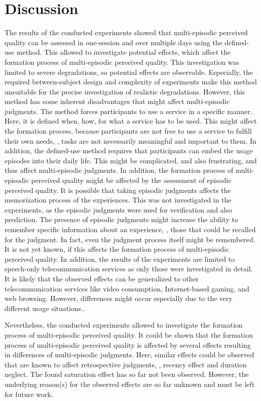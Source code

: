 \section{Discussion}
The results of the conducted experiments showed that multi-episodic perceived quality can be assessed in one-session and over multiple days using the defined-use method.
This allowed to investigate potential effects, which affect the formation process of multi-episodic perceived quality.
This investigation was limited to severe degradations, so potential effects are observable.
Especially, the required between-subject design and complexity of experiments make this method unsuitable for the precise investigation of realistic degradations.
However, this method has some inherent disadvantages that might affect multi-episodic judgments.
The method forces participants to use a service in a specific manner.
Here, it is defined when, how, for what a service has to be used.
This might affect the formation process, because participants are not free to use a service to fulfill their own needs, \ie, tasks are not necessarily meaningful and important to them.
In addition, the defined-use method requires that participants can embed the usage episodes into their daily life.
This might be complicated, and also frustrating, and thus affect multi-episodic judgments.
In addition, the formation process of multi-episodic perceived quality might be affected by the assessment of episodic perceived quality.
It is possible that taking episodic judgments affects the memorization process of the experiences.
This was not investigated in the experiments, as the episodic judgments were used for verification and also prediction.
The presence of episodic judgments might increase the ability to remember specific information about an experience, \ie, those that could be recalled for the judgment.
In fact, even the judgment process itself might be remembered.
It is not yet known, if this affects the formation process of multi-episodic perceived quality.
In addition, the results of the experiments are limited to speech-only telecommunication services as only those were investigated in detail.
It is likely that the observed effects can be generalized to other telecommunication services like video consumption, Internet-based gaming, and web browsing.
However, differences might occur especially due to the very different usage situations..

Nevertheless, the conducted experiments allowed to investigate the formation process of multi-episodic perceived quality.
It could be shown that the formation process of multi-episodic perceived quality is affected by several effects resulting in differences of multi-episodic judgments.
Here, similar effects could be observed that are known to affect retrospective judgments, \ie, recency effect and duration neglect.
The found saturation effect has so far not been observed.
However, the underlying reason(s) for the observed effects are so far unknown and must be left for future work.


